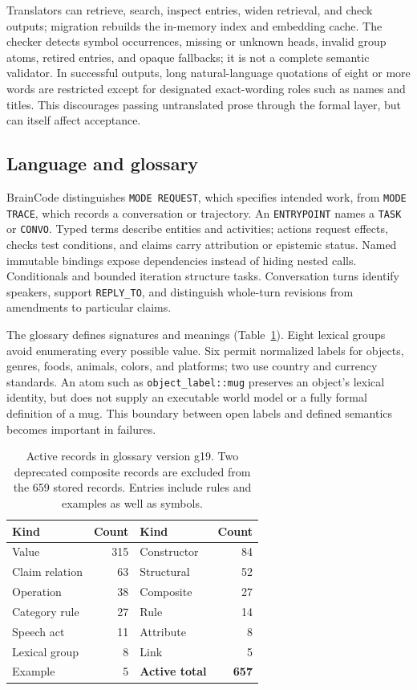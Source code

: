 \documentclass[11pt]{article}
\newcommand{\bc}{BrainCode}
\newcommand{\code}[1]{\texttt{#1}}
\begin{document}
Translators can retrieve, search, inspect entries, widen retrieval, and check outputs; migration rebuilds the in-memory index and embedding cache. The checker detects symbol occurrences, missing or unknown heads, invalid group atoms, retired entries, and opaque fallbacks; it is not a complete semantic validator. In successful outputs, long natural-language quotations of eight or more words are restricted except for designated exact-wording roles such as names and titles. This discourages passing untranslated prose through the formal layer, but can itself affect acceptance.

\subsection{Language and glossary}
\bc{} distinguishes \code{MODE REQUEST}, which specifies intended work, from \code{MODE TRACE}, which records a conversation or trajectory. An \code{ENTRYPOINT} names a \code{TASK} or \code{CONVO}. Typed terms describe entities and activities; actions request effects, checks test conditions, and claims carry attribution or epistemic status. Named immutable bindings expose dependencies instead of hiding nested calls. Conditionals and bounded iteration structure tasks. Conversation turns identify speakers, support \code{REPLY\_TO}, and distinguish whole-turn revisions from amendments to particular claims.

The glossary defines signatures and meanings (Table~\ref{tab:glossary}). Eight lexical groups avoid enumerating every possible value. Six permit normalized labels for objects, genres, foods, animals, colors, and platforms; two use country and currency standards. An atom such as \code{object\_label::mug} preserves an object's lexical identity, but does not supply an executable world model or a fully formal definition of a mug. This boundary between open labels and defined semantics becomes important in failures.

\begin{table}[t]
\centering\small
\begin{tabular}{lr@{\qquad}lr}
\toprule
Kind & Count & Kind & Count\\\midrule
Value &315& Constructor&84\\
Claim relation&63&Structural&52\\
Operation&38&Composite&27\\
Category rule&27&Rule&14\\
Speech act&11&Attribute&8\\
Lexical group&8&Link&5\\
Example&5&\textbf{Active total}&\textbf{657}\\
\bottomrule
\end{tabular}
\caption{Active records in glossary version g19. Two deprecated composite records are excluded from the 659 stored records. Entries include rules and examples as well as symbols.}
\label{tab:glossary}
\end{table}
\end{document}
